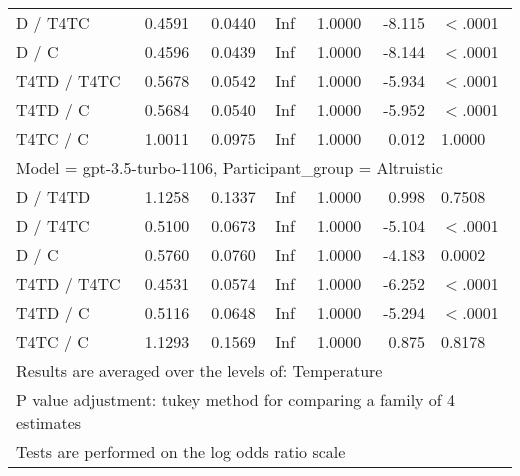 \begin{table}[ht]
\begin{tabular}{lrrrrrl}
  D / T4TC & 0.4591 & 0.0440 & Inf & 1.0000 & -8.115 & $<$.0001 \\ 
  D / C & 0.4596 & 0.0439 & Inf & 1.0000 & -8.144 & $<$.0001 \\ 
  T4TD / T4TC & 0.5678 & 0.0542 & Inf & 1.0000 & -5.934 & $<$.0001 \\ 
  T4TD / C & 0.5684 & 0.0540 & Inf & 1.0000 & -5.952 & $<$.0001 \\ 
  T4TC / C & 1.0011 & 0.0975 & Inf & 1.0000 & 0.012 & 1.0000 \\ 
   \hline
\multicolumn{7}{l}{Model = gpt-3.5-turbo-1106, Participant_group = Altruistic}\\
D / T4TD & 1.1258 & 0.1337 & Inf & 1.0000 & 0.998 & 0.7508 \\ 
  D / T4TC & 0.5100 & 0.0673 & Inf & 1.0000 & -5.104 & $<$.0001 \\ 
  D / C & 0.5760 & 0.0760 & Inf & 1.0000 & -4.183 & 0.0002 \\ 
  T4TD / T4TC & 0.4531 & 0.0574 & Inf & 1.0000 & -6.252 & $<$.0001 \\ 
  T4TD / C & 0.5116 & 0.0648 & Inf & 1.0000 & -5.294 & $<$.0001 \\ 
  T4TC / C & 1.1293 & 0.1569 & Inf & 1.0000 & 0.875 & 0.8178 \\ 
   \hline
\multicolumn{7}{l}{{\footnotesize Results are averaged over the levels of: Temperature}}\\

\multicolumn{7}{l}{{\footnotesize P value adjustment: tukey method for comparing a family of 4 estimates}}\\

\multicolumn{7}{l}{{\footnotesize Tests are performed on the log odds ratio scale}}\\
\end{tabular}
\end{table}
